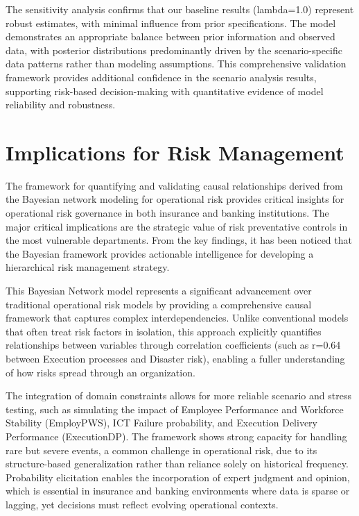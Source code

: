 The sensitivity analysis confirms that our baseline results (lambda=1.0) represent robust estimates, with minimal influence from prior specifications. The model demonstrates an appropriate balance between prior information and observed data, with posterior distributions predominantly driven by the scenario-specific data patterns rather than modeling assumptions.
This comprehensive validation framework provides additional confidence in the scenario analysis results, supporting risk-based decision-making with quantitative evidence of model reliability and robustness. 

\section{Implications for Risk Management}
The framework for quantifying and validating causal relationships derived from the Bayesian network modeling for operational risk provides critical insights for operational risk governance in both insurance and banking institutions. The major critical implications are the strategic value of risk preventative controls in the most vulnerable departments. 
From the key findings, it has been noticed that the Bayesian framework provides actionable intelligence for developing a hierarchical risk management strategy.

This Bayesian Network model represents a significant advancement over traditional operational risk models by providing a comprehensive causal framework that captures complex interdependencies. Unlike conventional models that often treat risk factors in isolation, this approach explicitly quantifies relationships between variables through correlation coefficients (such as r=0.64 between Execution processes and Disaster risk), enabling a fuller understanding of how risks spread through an organization.

The integration of domain constraints allows for more reliable scenario and stress testing, such as simulating the impact of Employee Performance and Workforce Stability (EmployPWS), ICT Failure probability, and Execution Delivery Performance (ExecutionDP). The framework shows strong capacity for handling rare but severe events, a common challenge in operational risk, due to its structure-based generalization rather than reliance solely on historical frequency. Probability elicitation enables the incorporation of expert judgment and opinion, which is essential in insurance and banking environments where data is sparse or lagging, yet decisions must reflect evolving operational contexts.


